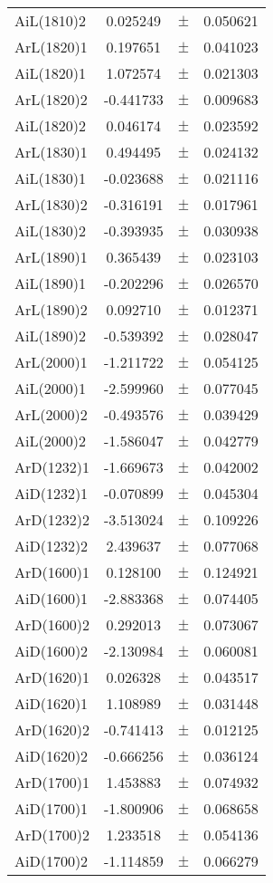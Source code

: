 \begin{table}
\begin{tiny}
\begin{tabular}{lccc}
AiL(1810)2 & 0.025249 & $\pm$ & 0.050621 \\
ArL(1820)1 & 0.197651 & $\pm$ & 0.041023 \\
AiL(1820)1 & 1.072574 & $\pm$ & 0.021303 \\
ArL(1820)2 & -0.441733 & $\pm$ & 0.009683 \\
AiL(1820)2 & 0.046174 & $\pm$ & 0.023592 \\
ArL(1830)1 & 0.494495 & $\pm$ & 0.024132 \\
AiL(1830)1 & -0.023688 & $\pm$ & 0.021116 \\
ArL(1830)2 & -0.316191 & $\pm$ & 0.017961 \\
AiL(1830)2 & -0.393935 & $\pm$ & 0.030938 \\
ArL(1890)1 & 0.365439 & $\pm$ & 0.023103 \\
AiL(1890)1 & -0.202296 & $\pm$ & 0.026570 \\
ArL(1890)2 & 0.092710 & $\pm$ & 0.012371 \\
AiL(1890)2 & -0.539392 & $\pm$ & 0.028047 \\
ArL(2000)1 & -1.211722 & $\pm$ & 0.054125 \\
AiL(2000)1 & -2.599960 & $\pm$ & 0.077045 \\
ArL(2000)2 & -0.493576 & $\pm$ & 0.039429 \\
AiL(2000)2 & -1.586047 & $\pm$ & 0.042779 \\
ArD(1232)1 & -1.669673 & $\pm$ & 0.042002 \\
AiD(1232)1 & -0.070899 & $\pm$ & 0.045304 \\
ArD(1232)2 & -3.513024 & $\pm$ & 0.109226 \\
AiD(1232)2 & 2.439637 & $\pm$ & 0.077068 \\
ArD(1600)1 & 0.128100 & $\pm$ & 0.124921 \\
AiD(1600)1 & -2.883368 & $\pm$ & 0.074405 \\
ArD(1600)2 & 0.292013 & $\pm$ & 0.073067 \\
AiD(1600)2 & -2.130984 & $\pm$ & 0.060081 \\
ArD(1620)1 & 0.026328 & $\pm$ & 0.043517 \\
AiD(1620)1 & 1.108989 & $\pm$ & 0.031448 \\
ArD(1620)2 & -0.741413 & $\pm$ & 0.012125 \\
AiD(1620)2 & -0.666256 & $\pm$ & 0.036124 \\
ArD(1700)1 & 1.453883 & $\pm$ & 0.074932 \\
AiD(1700)1 & -1.800906 & $\pm$ & 0.068658 \\
ArD(1700)2 & 1.233518 & $\pm$ & 0.054136 \\
AiD(1700)2 & -1.114859 & $\pm$ & 0.066279 \\
\bottomrule
\end{tabular}
\end{tiny}
\end{table}

